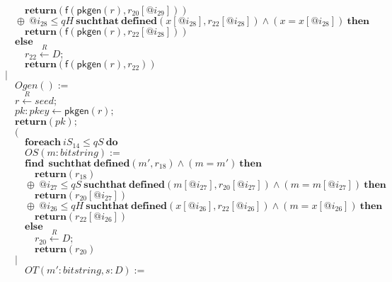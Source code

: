 \documentclass{article}
\newcommand{\store}{\leftarrow}
\newcommand{\getR}{\stackrel{R}{\store}}
\newcommand{\kw}[1]{\mathbf{#1}}
\newcommand{\kwf}[1]{\mathsf{#1}}
\newcommand{\var}[1]{\mathit{#1}}
\newcommand{\kwt}[1]{\mathit{#1}}
\newcommand{\kwp}[1]{\mathit{#1}}
\begin{document}
\begin{tabbing}
$\quad \quad \kw{return}\kwf{}(\kwf{f}(\kwf{pkgen}(\var{r}), \var{r}_{20}[\var{@i}_{29}]))$\\
$\quad \oplus\ \var{@i}_{28} \leq \kwp{qH}\ \kw{suchthat}\ \kw{defined}(\var{x}[\var{@i}_{28}], \var{r}_{22}[\var{@i}_{28}])\wedge (\var{x}  =  \var{x}[\var{@i}_{28}])\ \kw{then}$\\
$\quad \quad \kw{return}\kwf{}(\kwf{f}(\kwf{pkgen}(\var{r}), \var{r}_{22}[\var{@i}_{28}]))$\\
$\quad \kw{else}$\\
$\quad \quad \var{r}_{22} \getR \kwt{D};$\\
$\quad \quad \kw{return}\kwf{}(\kwf{f}(\kwf{pkgen}(\var{r}), \var{r}_{22}))$\\
$|$\\
$\quad Ogen() :=$\\
$\quad \var{r} \getR \kwt{seed};$\\
$\quad \var{pk}: \kwt{pkey} \store \kwf{pkgen}(\var{r});$\\
$\quad \kw{return}\kwf{}(\var{pk});$\\
$\quad ($\\
$\quad \quad \kw{foreach}\ \var{iS}_{14} \leq \kwp{qS}\ \kw{do}$\\
$\quad \quad OS(\var{m}: \kwt{bitstring}) :=$\\
$\quad \quad \kw{find}\ \ \kw{suchthat}\ \kw{defined}(\var{m'}, \var{r}_{18})\wedge (\var{m}  =  \var{m'})\ \kw{then}$\\
$\quad \quad \quad \kw{return}\kwf{}(\var{r}_{18})$\\
$\quad \quad \oplus\ \var{@i}_{27} \leq \kwp{qS}\ \kw{suchthat}\ \kw{defined}(\var{m}[\var{@i}_{27}], \var{r}_{20}[\var{@i}_{27}])\wedge (\var{m}  =  \var{m}[\var{@i}_{27}])\ \kw{then}$\\
$\quad \quad \quad \kw{return}\kwf{}(\var{r}_{20}[\var{@i}_{27}])$\\
$\quad \quad \oplus\ \var{@i}_{26} \leq \kwp{qH}\ \kw{suchthat}\ \kw{defined}(\var{x}[\var{@i}_{26}], \var{r}_{22}[\var{@i}_{26}])\wedge (\var{m}  =  \var{x}[\var{@i}_{26}])\ \kw{then}$\\
$\quad \quad \quad \kw{return}\kwf{}(\var{r}_{22}[\var{@i}_{26}])$\\
$\quad \quad \kw{else}$\\
$\quad \quad \quad \var{r}_{20} \getR \kwt{D};$\\
$\quad \quad \quad \kw{return}\kwf{}(\var{r}_{20})$\\
$\quad |$\\
$\quad \quad OT(\var{m'}: \kwt{bitstring}, \var{s}: \kwt{D}) :=$\\

\end{tabbing}
\end{document}
